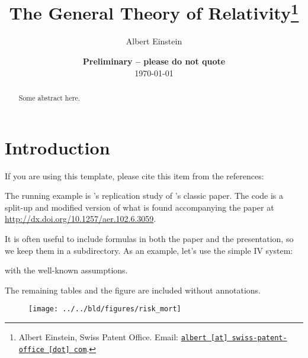 \documentclass[11pt, a4paper, leqno]{article}
\begin{document}
\title{The General Theory of Relativity\thanks{Albert Einstein, Swiss Patent Office. Email: \href{mailto:albert@swiss-patent-office.com}{\nolinkurl{albert [at] swiss-patent-office [dot] com}}.}}

\author{Albert Einstein}

\date{
    {\bf Preliminary -- please do not quote}
    \\[1ex]
    \today
}

\maketitle


\begin{abstract}
    Some abstract here.
\end{abstract}
\clearpage

\section{Introduction} %
\label{sec:introduction}

If you are using this template, please cite this item from the references: \citet{GaudeckerEconProjectTemplates}

The running example is \citeauthor{Albouy12}'s \citeyear{Albouy12} replication study of \citeauthor{AcemogluJohnsonRobinson01}'s classic \citeyear{AcemogluJohnsonRobinson01} paper. The code is a split-up and modified version of what is found accompanying the paper at \url{http://dx.doi.org/10.1257/aer.102.6.3059}.

It is often useful to include formulas in both the paper and the presentation, so we keep them in a subdirectory. As an example, let's use the simple IV system:

with the well-known assumptions.

The remaining tables and the figure are included without annotations.\\[4ex]




\begin{figure}
    \centering
    \texttt{[image: ../../bld/figures/risk\_mort]}
\end{figure}







\clearpage

\printbibliography
{}





\end{document}
